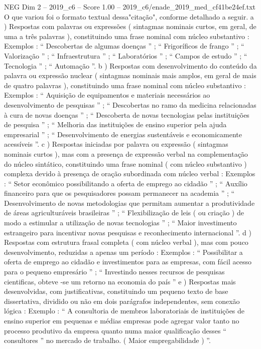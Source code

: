 \begin{textsample}{NEG Dim 2 – 2019\_c6 – Score 1.00 – 2019\_c6/enade\_2019\_med\_cf41be24ef.txt}
O que variou foi o formato textual dessa"citação", conforme detalhado a seguir. a ) Respostas com palavras ou expressões ( sintagmas nominais curtos, em geral, de uma a três palavras ), constituindo uma frase nominal com núcleo substantivo : Exemplos : “ Descobertas de algumas doenças ” ; “ Frigoríficos de frango ” ; “ Valorização ” ; “ Infraestrutura ” ; “ Laboratórios ” ; “ Campos de estudo ” ; “ Tecnologia ” ; “ Automação ”. b ) Respostas com desenvolvimento do conteúdo da palavra ou expressão nuclear ( sintagmas nominais mais amplos, em geral de mais de quatro palavras ), constituindo uma frase nominal com núcleo substantivo : Exemplos : “ Aquisição de equipamentos e materiais necessários ao desenvolvimento de pesquisas ” ; “ Descobertas no ramo da medicina relacionadas à cura de novas doenças ” ; “ Descoberta de novas tecnologias pelas instituições de pesquisa ” ; “ Melhoria das instituições de ensino superior pela ajuda empresarial ” ; “ Desenvolvimento de energias sustentáveis e economicamente acessíveis ”. c ) Respostas iniciadas por palavra ou expressão ( sintagmas nominais curtos ), mas com a presença de expressão verbal na complementação do núcleo sintático, constituindo uma frase nominal ( com núcleo substantivo ) complexa devido à presença de oração subordinada com núcleo verbal : Exemplos : “ Setor econômico possibilitando a oferta de emprego ao cidadão ” ; “ Auxílio financeiro para que os pesquisadores possam permanecer na academia ” ; “ Desenvolvimento de novas metodologias que permitam aumentar a produtividade de áreas agriculturáveis brasileiras ” ; “ Flexibilização de leis ( ou criação ) de modo a estimular a utilização de novas tecnologias ” ; “ Maior investimento estrangeiro para incentivar novas pesquisas e reconhecimento internacional ”. d ) Respostas com estrutura frasal completa ( com núcleo verbal ), mas com pouco desenvolvimento, reduzidas a apenas um período : Exemplos : “ Possibilitar a oferta de emprego ao cidadão e investimentos para as empresas, com fácil acesso para o pequeno empresário ” ; “ Investindo nesses recursos de pesquisas cientificas, obteve -se um retorno na economia do país ” e ) Respostas mais desenvolvidas, com justificativas, constituindo um pequeno texto de base dissertativa, dividido ou não em dois parágrafos independentes, sem conexão lógica : Exemplo : “ A consultoria de membros laboratoriais de instituições de ensino superior em pequenas e médias empresas pode agregar valor tanto no processo produtivo da empresa quanto numa maior qualificação desses “ consultores ” no mercado de trabalho. ( Maior empregabilidade ) ”.

\end{textsample}
